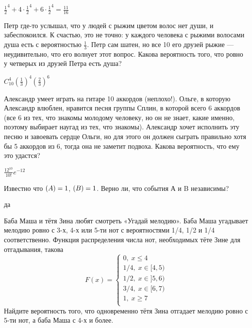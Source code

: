\documentclass[12pt, addpoints, answers]{exam} %
\let\P\relax
\DeclareMathOperator{\P}{\mathbb{P}}
\begin{document}
\begin{questions}
\begin{solution}
 $\frac{1}{2}^4 + 4\cdot \frac{1}{2}^4 + 6\cdot \frac{1}{2}^4 = \frac{11}{16}$
\end{solution}


\question Петр где-то услышал, что у людей с рыжим цветом волос нет души, и забеспокоился. К счастью, это не точно: у каждого человека с рыжими волосами душа есть с вероятностью $\frac13$. Петр сам шатен, но все 10 его друзей рыжие ---  неудивительно, что его волнует этот вопрос. Какова вероятность того, что ровно у четверых из друзей Петра есть душа?


\begin{solution}
 $C_{10}^4\left(\frac{1}{3}\right)^4\left(\frac{2}{3}\right)^6$
\end{solution}

\question Александр умеет играть на гитаре 10 аккордов (неплохо!). Ольге, в которую Александр влюблен, нравится песня группы Сплин, в которой всего 6 аккордов (все 6 из тех, что знакомы молодому человеку, но он не знает, какие именно, поэтому выбирает наугад из тех, что знакомы). Александр хочет исполнить эту песню и завоевать сердце Ольги, но для этого он должен сыграть правильно хотя бы 5 аккордов из 6, тогда она не заметит подвоха. Какова вероятность, что ему это удастся?


\begin{solution}
 $\frac{12^{10}}{10!}e^{-12}$
\end{solution}






\question Известно что $\P(A) = 1$, $\P(B)=1$. Верно ли, что события А и B независимы?

\begin{solution}
 да
\end{solution}

\question Баба Маша и тётя Зина любят смотреть «Угадай мелодию». Баба Маша угадывает мелодию ровно с 3-х, 4-х или 5-ти нот с вероятностями 1/4, 1/2 и 1/4 соответственно. Функция распределения числа нот, необходимых тёте Зине для отгадывания, такова
\[
F(x)=\begin{cases}
0, \; x \leq4 \\
1/4, \; x \in[4,5)\\
1/2, \; x \in]5,6)\\
3/4, \; x \in[6,7)\\
1, \; x \geq7 \\
\end{cases}
\]
Найдите вероятность того, что одновременно тётя Зина отгадает мелодию ровно с 5-ти нот, а баба Маша с 4-х и более.




\end{questions}
\end{document}
